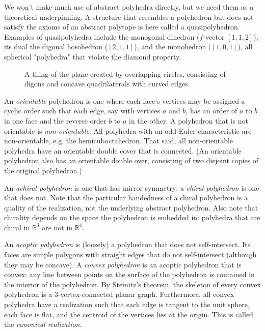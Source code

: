 \documentclass{amsart}[12pt]
\begin{document}
We won't make much use of abstract polyhedra directly, but we need them as a
theoretical underpinning. A structure that resembles a polyhedron but does not
satisfy the axioms of an abstract polytope is here called a quasipolyhedron.
Examples of quasipolyhedra include the monogonal dihedron ($f$-vector
$[1,1,2]$), its dual the digonal hosohedron ($[2,1,1]$), and the monohedron
($[1,0,1]$), all spherical "polyhedra" that violate the diamond property.

\begin{figure}
\caption{A tiling of the plane created by overlapping circles, consisting of
digons and concave quadrilaterals with curved edges.}
\label{fig:circlesquare}
\end{figure}

An \textit{orientable} polyhedron is one where each face's vertices may be assigned a cyclic order such that each edge, say with vertices $a$ and $b$, has an order of $a$ to $b$ in one face and the reverse order $b$ to $a$ in the other. \cite{grunbaum94} A polyhedron that is not orientable is \textit{non-orientable}. All polyhedra with an odd Euler characteristic are non-orientable, e.g. the hemicuboctahedron. That said, all non-orientable polyhedra have an orientable double cover that is connected. (An orientable polyhedron also has an orientable double over, consisting of two disjoint copies of the original polyhedron.)

An \textit{achiral polyhedron} is one that has mirror symmetry:
a \textit{chiral polyhedron} is one that does not. Note that the particular
handedness of a chiral polyhedron is a quality of the realization, not the
underlying abstract polyhedron.
Also note that chirality depends on the space the polyhedron is embedded in:
polyhedra that are chiral in $\mathbb{R}^3$ are not in $\mathbb{R}^4$.

An \textit{acoptic polyhedron} is (loosely) a polyhedron that does not
self-intersect. \cite{grunbaum99} Its faces are simple polygons with straight
edges that do not self-intersect (although they may be concave). A
\textit{convex polyhedron} is an acoptic polyhedron that is convex: any line
between points on the surface of the polyhedron is contained in the interior of
the polyhedron. By Steinitz's theorem, the skeleton of every convex polyhedron
is a 3-vertex-connected planar graph. Furthermore, all convex polyhedra have a
realization such that each edge is tangent to the unit sphere, each face is
flat, and the centroid of the vertices lies at the origin.\cite{ziegler}
This is called the \textit{canonical realization}.
\end{document}
